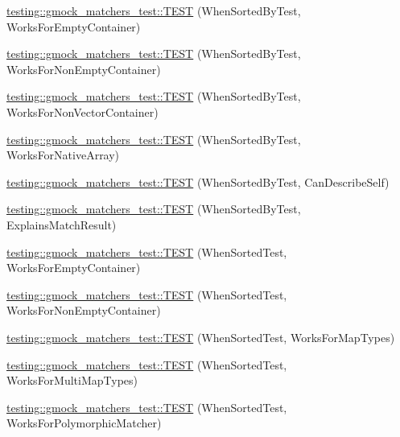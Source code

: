 \begin{DoxyCompactItemize}
\item 
\hyperlink{namespacetesting_1_1gmock__matchers__test_a9d88fbc6e2d01b66a1c10b192b25a802}{testing\+::gmock\+\_\+matchers\+\_\+test\+::\+T\+E\+ST} (When\+Sorted\+By\+Test, Works\+For\+Empty\+Container)
\item 
\hyperlink{namespacetesting_1_1gmock__matchers__test_a3095e5533ec12a67377dec6b0769d9a8}{testing\+::gmock\+\_\+matchers\+\_\+test\+::\+T\+E\+ST} (When\+Sorted\+By\+Test, Works\+For\+Non\+Empty\+Container)
\item 
\hyperlink{namespacetesting_1_1gmock__matchers__test_a24d3caacabfef918b7a5b9dacc5e3a66}{testing\+::gmock\+\_\+matchers\+\_\+test\+::\+T\+E\+ST} (When\+Sorted\+By\+Test, Works\+For\+Non\+Vector\+Container)
\item 
\hyperlink{namespacetesting_1_1gmock__matchers__test_a33b65fc6db83270b5c29073dbbf69c4e}{testing\+::gmock\+\_\+matchers\+\_\+test\+::\+T\+E\+ST} (When\+Sorted\+By\+Test, Works\+For\+Native\+Array)
\item 
\hyperlink{namespacetesting_1_1gmock__matchers__test_afc2d1e86837d8e3103748cb2e96b61c3}{testing\+::gmock\+\_\+matchers\+\_\+test\+::\+T\+E\+ST} (When\+Sorted\+By\+Test, Can\+Describe\+Self)
\item 
\hyperlink{namespacetesting_1_1gmock__matchers__test_ada0850ab21beccb47802aab36c06d163}{testing\+::gmock\+\_\+matchers\+\_\+test\+::\+T\+E\+ST} (When\+Sorted\+By\+Test, Explains\+Match\+Result)
\item 
\hyperlink{namespacetesting_1_1gmock__matchers__test_a76aaffd49c78fdee18f11fae5ea3f6fb}{testing\+::gmock\+\_\+matchers\+\_\+test\+::\+T\+E\+ST} (When\+Sorted\+Test, Works\+For\+Empty\+Container)
\item 
\hyperlink{namespacetesting_1_1gmock__matchers__test_a2bfbef7e777d319e3d96fc98340bb558}{testing\+::gmock\+\_\+matchers\+\_\+test\+::\+T\+E\+ST} (When\+Sorted\+Test, Works\+For\+Non\+Empty\+Container)
\item 
\hyperlink{namespacetesting_1_1gmock__matchers__test_acc4a96f3aa369fda8f554f5ac4495f4b}{testing\+::gmock\+\_\+matchers\+\_\+test\+::\+T\+E\+ST} (When\+Sorted\+Test, Works\+For\+Map\+Types)
\item 
\hyperlink{namespacetesting_1_1gmock__matchers__test_ab5de36ad02781be67163ae24d08b5454}{testing\+::gmock\+\_\+matchers\+\_\+test\+::\+T\+E\+ST} (When\+Sorted\+Test, Works\+For\+Multi\+Map\+Types)
\item 
\hyperlink{namespacetesting_1_1gmock__matchers__test_a587c3799433426782ccdcfe5cb07f5bc}{testing\+::gmock\+\_\+matchers\+\_\+test\+::\+T\+E\+ST} (When\+Sorted\+Test, Works\+For\+Polymorphic\+Matcher)

\end{DoxyCompactItemize}
